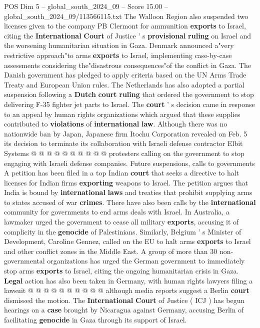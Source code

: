 \begin{textsample}{POS Dim 5 – global\_south\_2024\_09 – Score 15.00 – global\_south\_2024\_09/113566115.txt}
The Walloon Region also suspended two licenses given to the company PB Clermont for ammunition \textbf{exports} to Israel, citing the \textbf{International} \textbf{Court} of Justice ' s \textbf{provisional} \textbf{ruling} on Israel and the worsening humanitarian situation in Gaza.
Denmark announced a"very restrictive approach"to arms \textbf{exports} to Israel, implementing case-by-case assessments considering the"disastrous consequences"of the conflict in Gaza.
The Danish government has pledged to apply criteria based on the UN Arms Trade Treaty and European Union rules.
The Netherlands has also adopted a partial suspension following a \textbf{Dutch} \textbf{court} \textbf{ruling} that ordered the government to stop delivering F-35 fighter jet parts to Israel.
The \textbf{court} ' s decision came in response to an appeal by human rights organizations which argued that these supplies contributed to \textbf{violations} of \textbf{international} \textbf{law}.
Although there was no nationwide ban by Japan, Japanese firm Itochu Corporation revealed on Feb. 5 its decision to terminate its collaboration with Israeli defense contractor Elbit Systems @ @ @ @ @ @ @ @ @ @ protesters calling on the government to stop engaging with Israeli defense companies.
Future suspensions, calls to governments A petition has been filed in a top Indian \textbf{court} that seeks a directive to halt licenses for Indian firms \textbf{exporting} weapons to Israel.
The petition argues that India is bound by \textbf{international} \textbf{laws} and treaties that prohibit supplying arms to states accused of war \textbf{crimes}.
There have also been calls by the \textbf{international} community for governments to end arms deals with Israel.
In Australia, a lawmaker urged the government to cease all military \textbf{exports}, accusing it of complicity in the \textbf{genocide} of Palestinians.
Similarly, Belgium ' s Minister of Development, Caroline Gennez, called on the EU to halt arms \textbf{exports} to Israel and other conflict zones in the Middle East.
A group of more than 30 non-governmental organizations has urged the German government to immediately stop arms \textbf{exports} to Israel, citing the ongoing humanitarian crisis in Gaza. \textbf{Legal} action has also been taken in Germany, with human rights lawyers filing a lawsuit @ @ @ @ @ @ @ @ @ @ although media reports suggest a Berlin \textbf{court} dismissed the motion.
The \textbf{International} \textbf{Court} of Justice ( ICJ ) has begun hearings on a \textbf{case} brought by Nicaragua against Germany, accusing Berlin of facilitating \textbf{genocide} in Gaza through its support of Israel.

\end{textsample}
